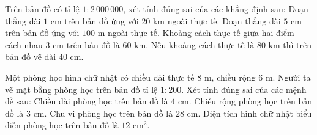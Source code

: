 \begin{ex} %
Trên bản đồ có tỉ lệ $1 : 2\,000\,000$, xét tính đúng sai của các khẳng định sau:
\choiceTF
{\True Đoạn thẳng dài $1\text{ cm}$ trên bản đồ ứng với $20\text{ km}$ ngoài thực tế.}
{Đoạn thẳng dài $5\text{ cm}$ trên bản đồ ứng với $100\text{ m}$ ngoài thực tế.}
{\True Khoảng cách thực tế giữa hai điểm cách nhau $3\text{ cm}$ trên bản đồ là $60\text{ km}$.}
{Nếu khoảng cách thực tế là $80\text{ km}$ thì trên bản đồ vẽ dài $40\text{ cm}$.}
\end{ex}

\begin{ex} %
Một phòng học hình chữ nhật có chiều dài thực tế $8\text{ m}$, chiều rộng $6\text{ m}$. Người ta vẽ mặt bằng phòng học trên bản đồ tỉ lệ $1 : 200$. Xét tính đúng sai của các mệnh đề sau:
\choiceTF
{\True Chiều dài phòng học trên bản đồ là $4\text{ cm}$.}
{\True Chiều rộng phòng học trên bản đồ là $3\text{ cm}$.}
{Chu vi phòng học trên bản đồ là $28\text{ cm}$.}
{\True Diện tích hình chữ nhật biểu diễn phòng học trên bản đồ là $12\text{ cm}^2$.}
\end{ex}

